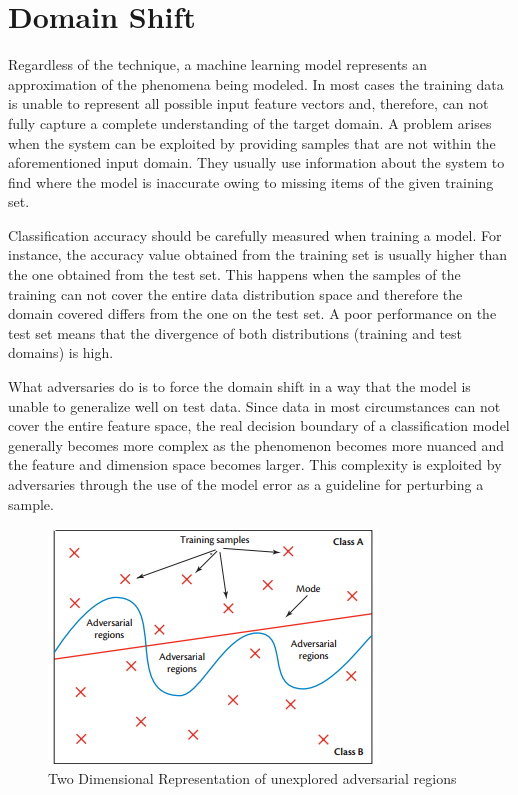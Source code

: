 \section{Domain Shift}

Regardless of the technique, a machine learning model represents an approximation of the phenomena being modeled. In most cases the training data is unable to represent all possible input feature vectors and, therefore, can not fully capture a complete understanding of the target domain. A problem arises when the system can be exploited by providing samples that are not within the aforementioned input domain. They usually use information about the system to find where the model is inaccurate owing to missing items of the given training set.

Classification accuracy should be carefully measured when training a model. For instance, the accuracy value obtained from the training set is usually higher than the one obtained from the test set. This happens when the samples of the training can not cover the entire data distribution space and therefore the domain covered differs from the one on the test set. A poor performance on the test set means that the divergence of both distributions (training and test domains) is high. 

What adversaries do is to force the domain shift in a way that the model is unable to generalize well on test data. Since data in most circumstances can not cover the entire feature space, the real decision boundary of a classification model generally becomes more complex as the phenomenon becomes more nuanced and the feature and dimension space becomes larger. This complexity is exploited by adversaries through the use of the model error as a guideline for perturbing a sample.

\begin{figure}[!h]
\centering
	\includegraphics[scale=1.0]{adv_space.png}
\caption{Two Dimensional Representation of unexplored adversarial regions \cite{papernot_2017}}
\label{fig:adv_space}
\end{figure}

